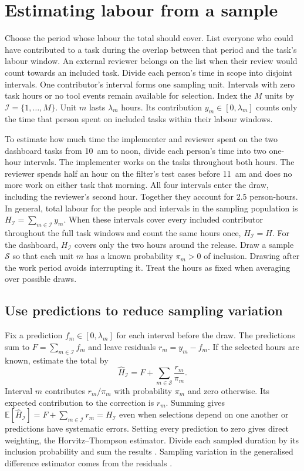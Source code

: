 \section{Estimating labour from a sample}
\label{sec:sampling}

Choose the period whose labour the total should cover. List everyone who could have contributed to a task during the overlap between that period and the task's labour window. An external reviewer belongs on the list when their review would count towards an included task. Divide each person's time in scope into disjoint intervals. One contributor's interval forms one sampling unit. Intervals with zero task hours or no tool events remain available for selection. Index the $M$ units by $\mathcal I=\{1,\ldots,M\}$. Unit $m$ lasts $\lambda_m$ hours. Its contribution $y_m\in[0,\lambda_m]$ counts only the time that person spent on included tasks within their labour windows.

To estimate how much time the implementer and reviewer spent on the two dashboard tasks from 10~am to noon, divide each person's time into two one-hour intervals. The implementer works on the tasks throughout both hours. The reviewer spends half an hour on the filter's test cases before 11~am and does no more work on either task that morning. All four intervals enter the draw, including the reviewer's second hour. Together they account for 2.5 person-hours. In general, total labour for the people and intervals in the sampling population is $H_{\mathcal I}=\sum_{m\in\mathcal I}y_m$. When these intervals cover every included contributor throughout the full task windows and count the same hours once, $H_{\mathcal I}=H$. For the dashboard, $H_{\mathcal I}$ covers only the two hours around the release. Draw a sample $\mathcal S$ so that each unit $m$ has a known probability $\pi_m>0$ of inclusion. Drawing after the work period avoids interrupting it. Treat the hours as fixed when averaging over possible draws.

\subsection{Use predictions to reduce sampling variation}

Fix a prediction $f_m\in[0,\lambda_m]$ for each interval before the draw. The predictions sum to $F=\sum_{m\in\mathcal I}f_m$ and leave residuals $r_m=y_m-f_m$. If the selected hours are known, estimate
the total by
\begin{equation}
  \widehat H_{\mathcal I}=F+\sum_{m\in\mathcal S}\frac{r_m}{\pi_m}.
  \label{eq:short-difference}
\end{equation}
Interval $m$ contributes $r_m/\pi_m$ with probability $\pi_m$ and zero otherwise. Its expected contribution to the correction is $r_m$. Summing gives $\mathbb{E}[\widehat H_{\mathcal I}]=F+\sum_{m\in\mathcal I}r_m=H_{\mathcal I}$ even when selections depend on one another or predictions have systematic errors. Setting every prediction to zero gives direct weighting, the Horvitz--Thompson estimator. Divide each sampled duration by its inclusion probability and sum the results \cite{horvitz1952}. Sampling variation in the generalised difference estimator comes from the residuals \cite{cassel1976}.

